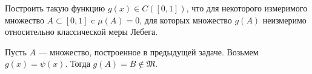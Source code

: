 \begin{task}{11}
Построить такую функцию $g(x) \in C([0, 1])$, что для некоторого измеримого множество $A \subset [0,1]$ c $\mu(A) = 0$, для которых множество $g(A)$ неизмеримо относительно классической меры Лебега.
\end{task}

\begin{solution}
Пусть $A$ --- множество, построенное в предыдущей задаче. Возьмем $g(x) = \psi(x)$. Тогда $g(A) = B \notin \mathfrak{M}$.
\end{solution}